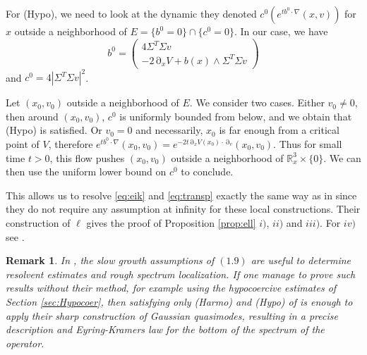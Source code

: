\documentclass[12pt]{amsart}
\newcommand{\R}{\mathbb R}
\numberwithin{equation}{section}
\numberwithin{figure}{section}
\DeclareMathOperator{\p}{\partial}
\newtheorem{remark}[defin]{Remark}
\begin{document}
For (Hypo), we need to look at the dynamic they denoted $c^0(e^{tb^0\cdot\nabla}(x,v))$ for $x$ outside a neighborhood of $E = \{b^0 = 0\}\cap\{c^0 = 0\}$. In our case, we have
\begin{equation*}
b^0 = \begin{pmatrix}
    4\Sigma^T\Sigma v\\
     - 2\p_xV + b(x)\wedge \Sigma^T\Sigma v
\end{pmatrix}
\end{equation*}
and $c^0 = 4|\Sigma^T\Sigma v|^2$.

Let $(x_0,v_0)$ outside a neighborhood of $E$. We consider two cases. Either $v_0\neq0$, then around $(x_0,v_0)$, $c^0$ is uniformly bounded from below, and we obtain that (Hypo) is satisfied. Or $v_0 = 0$ and necessarily, $x_0$ is far enough from a critical point of $V$, therefore $e^{tb^0\cdot\nabla}(x_0,v_0) = e^{- 2t\p_xV(x_0)\cdot\p_v}(x_0,v_0)$. Thus for small time $t>0$, this flow pushes $(x_0,v_0)$ outside a neighborhood of $\R^3_x\times\{0\}$. We can then use the uniform lower bound on $c^0$ to conclude.

This allows us to resolve \eqref{eq:eik} and \eqref{eq:transp} exactly the same way as in \cite{BoLePMi22} since they do not require any assumption at infinity for these local constructions. Their construction of $\ell$ gives the proof of Proposition \ref{prop:ell} $i)$, $ii)$ and $iii)$. For $iv)$ see \cite[Lemma 4.1]{BoLePMi22}.

\begin{remark}
    In \cite{BoLePMi22}, the slow growth assumptions of $(1.9)$ are useful to determine resolvent estimates and rough spectrum localization. If one manage to prove such results without their method, for example using the hypocoercive estimates of Section \ref{sec:Hypocoer}, then satisfying only (Harmo) and (Hypo) of \cite{BoLePMi22} is enough to apply their sharp construction of Gaussian quasimodes, resulting in a precise description and Eyring-Kramers law for the bottom of the spectrum of the operator.
\end{remark}
\end{document}
